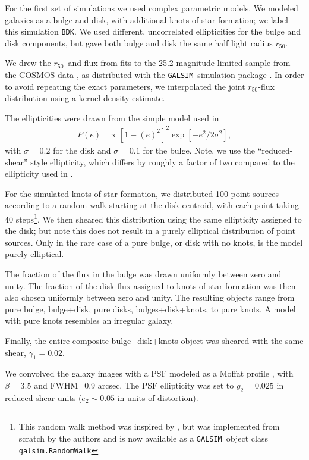 \documentclass[iop]{emulateapj}
\newcommand{\hlr}{$r_{50}$}
\newcommand{\bdsim}{\texttt{BDK}}
\newcommand{\galsim}{\texttt{GALSIM}}
\begin{document}
For the first set of
simulations we used complex parametric models.  We modeled galaxies as a bulge
and disk, with additional knots of star formation; we label this simulation
\bdsim.  We used different, uncorrelated ellipticities for the bulge and disk
components, but gave both bulge and disk the same half light radius \hlr.

We drew the \hlr\ and flux from fits \citep{LacknerGunn2012} to the 25.2
magnitude limited sample from the COSMOS data
\citep{Scoville2007a,Scoville2007b}, as distributed with the \galsim\
simulation package \citep{GALSIM2015}.  In order to avoid repeating the exact
parameters, we interpolated the joint \hlr-flux distribution using a kernel
density estimate.

The ellipticities were drawn from the simple model used in \cite{bfd2016}
\begin{align} \label{eq:edist}
    P(e) &\propto \left[1-(e)^2\right]^2 \exp\left[-e^2/2\sigma^2\right],
\end{align}
with $\sigma=0.2$ for the disk and $\sigma=0.1$ for the bulge.  Note, we use
the ``reduced-shear'' style ellipticity, which differs by roughly a factor of
two compared to the ellipticity used in \citet{bfd2016}.

For the simulated knots of star formation, we distributed 100 point sources
according to a random walk starting at the disk centroid, with each point
taking 40 steps\footnote{This random walk method was inspired by
\cite{Zhang2008FourierQuadI}, but was implemented from scratch by the authors
and is now available as a \galsim\ object class \texttt{galsim.RandomWalk}}.
We then sheared this distribution using the same ellipticity assigned to the
disk; but note this does not result in a purely elliptical distribution of
point sources.  Only in the rare case of a pure bulge, or disk with no knots,
is the model purely elliptical.

The fraction of the flux in the bulge was drawn uniformly between zero and
unity.  The fraction of the disk flux assigned to knots of star formation
was then also chosen uniformly between zero and unity.  The resulting 
objects range from pure bulge, bulge+disk, pure disks, bulges+disk+knots, 
to pure knots. A model with pure knots resembles an irregular galaxy.

Finally, the entire composite bulge+disk+knots object was sheared with the same
shear, $\gamma_1=0.02$.

We convolved the galaxy images with a PSF modeled as a Moffat profile
\citep{Moffat1969}, with $\beta=3.5$ and FWHM=0.9 arcsec. The PSF ellipticity was set to $g_2 = 0.025$ in reduced shear units ($e_2 \sim 
0.05$ in units of distortion). 
\end{document}
